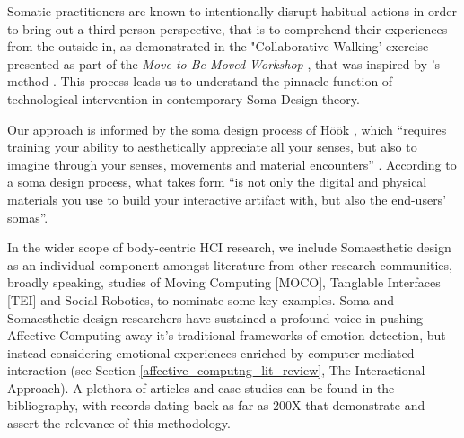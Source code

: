 Somatic practitioners are known to intentionally disrupt habitual actions in order to bring out a third-person perspective, that is to comprehend their experiences from the outside-in, as demonstrated in the "Collaborative Walking' exercise presented as part of the \textit{Move to Be Moved Workshop} \cite{hook_embracing_2018}, that was inspired by \citeauthor{loke_moving_2013}'s method \cite{loke_moving_2013}. This process leads us to understand the pinnacle function of technological intervention in contemporary Soma Design theory. 

Our approach is informed by the soma design process of Höök \cite{hook_designing_2018}, which “requires training your ability to aesthetically appreciate all your senses, but also to imagine through your senses, movements and material encounters” \cite{hook_soma_2019}. According to a soma design process, what takes form “is not only the digital and physical materials you use to build your interactive artifact with, but also the end-users’ somas”. 

In the wider scope of body-centric HCI research, we include Somaesthetic design as an individual component amongst literature from other research communities, broadly speaking, studies of Moving Computing [MOCO], Tanglable Interfaces [TEI] and Social Robotics, to nominate some key examples. Soma and Somaesthetic design researchers have sustained a profound voice in pushing Affective Computing away it's traditional frameworks of emotion detection, but instead considering emotional experiences enriched by computer mediated interaction (see Section \ref{affective_computng_lit_review}, The Interactional Approach). A plethora of articles and case-studies can be found in the bibliography, with records dating back as far as 200X that demonstrate and assert the relevance of this methodology.




